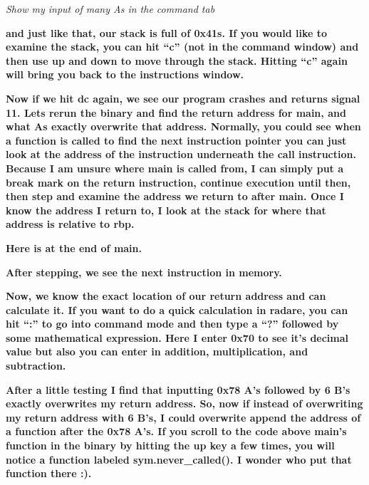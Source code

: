 \documentclass[letterpaper]{article}
\newcommand{\sitfig}[3]{
\begin{figure}[H]
\centering
\makebox[\textwidth][c]{
#2
}
\label{#1}
\end{figure}
}
\newcommand{\sitgfx}[4][scale=1.0]{
\sitfig{#3}{\texttt{[image: \#2]}}{#4}
}
\begin{document}
  
\sitgfx[width=5.8335in,height=3.6457in]{FINALWORKINGDOCFORMERLYPRECURSOR-img092.png}{fig:unk}{TODO CAPTION}
 

\textit{Show my input of many As in the command tab}

\textbf{and just like that, our stack is full of 0x41s. If you would like to examine the stack, you can hit ``c'' (not
in the command window) and then use up and down to move through the stack. Hitting ``c'' again will bring you back to
the instructions window.}

  
\sitgfx[width=5.8335in,height=3.6457in]{FINALWORKINGDOCFORMERLYPRECURSOR-img093.png}{fig:unk}{TODO CAPTION}
 

\textbf{Now if we hit dc again, we see our program crashes and returns signal 11. Lets rerun the binary and find the
return address for main, and what As exactly overwrite that address. Normally, you could see when a function is called
to find the next instruction pointer you can just look at the address of the instruction underneath the call
instruction. Because I am unsure where main is called from, I can simply put a break mark on the return instruction,
continue execution until then, then step and examine the address we return to after main. Once I know the address I
return to, I look at the stack for where that address is relative to rbp.}

\textbf{Here is at the end of main.}\newline
  
\sitgfx[width=5.8335in,height=3.6457in]{FINALWORKINGDOCFORMERLYPRECURSOR-img094.png}{fig:unk}{TODO CAPTION}
 

\textbf{After stepping, we see the next instruction in memory.\newline
}  
\sitgfx[width=5.8335in,height=3.6457in]{FINALWORKINGDOCFORMERLYPRECURSOR-img095.png}{fig:unk}{TODO CAPTION}
 

\textbf{Now, we know the exact location of our return address and can calculate it. If you want to do a quick
calculation in radare, you can hit ``:'' to go into command mode and then type a ``?'' followed by some mathematical
expression. Here I enter 0x70 to see it's decimal value but also you can enter in addition, multiplication, and
subtraction.}

  
\sitgfx[width=5.8335in,height=3.6457in]{FINALWORKINGDOCFORMERLYPRECURSOR-img089.png}{fig:unk}{TODO CAPTION}
 

\textbf{After a little testing I find that inputting 0x78 A's followed by 6 B's exactly overwrites my return address.
So, now if instead of overwriting my return address with 6 B's, I could overwrite append the address of a function
after the 0x78 A's. If you scroll to the code above main's function in the binary by hitting the up key a few times,
you will notice a function labeled sym.never\_called(). I wonder who put that function there :).}
\end{document}

